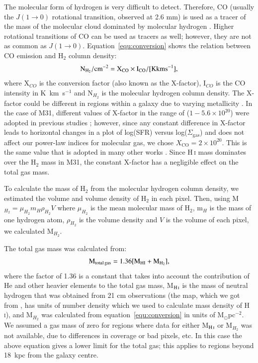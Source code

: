 The molecular form of hydrogen is very difficult to detect. Therefore, CO (usually the $J(1\rightarrow 0)$ rotational transition, observed at 2.6 mm) is used as a tracer of the mass of the molecular cloud dominated by molecular hydrogen \citep[see, for example,][]{Sanders84}. Higher rotational transitions of CO can be used as tracers as well; however, they are not as common as $J(1\rightarrow 0)$. Equation~\ref{equ:conversion} shows the relation between CO emission and H$_2$ column density:
\begin{equation}
\label{equ:conversion}
\rm N_{H_2}/\rm cm^{-2} = X_{CO} \times I_{CO}/[{\mathrm K km s^{-1}}],
\end{equation}
\noindent where X$_{CO}$ is the conversion factor (also known as the X-factor), I$_{CO}$ is the CO intensity in  K~km~s$^{-1}$ and N$_{H_2}$ is the molecular hydrogen column density. The X-factor could be different in regions within a galaxy due to varying metallicity \citep{Wilson95, Bosselli02, Bolato13}. In the case of M31, different values of X-factor in the range of ($1-5.6 \times 10^{20}$) were adopted in previous studies \citep[e.g.][]{Ford13, Bolato13, Leroy11, Bolato08, Nieten06}; however, since any constant difference in X-factor leads to horizontal changes in a plot of log(SFR) versus log($\Sigma_{\mathrm {gas}}$) and does not affect our power-law indices for molecular gas, we chose $X_{\mathrm {CO}}= 2 \times 10^{20}$. This is the same value that is adopted in many other works \citep[e.g.][]{Ford13, Smith12}. Since H\,{\textsc i} mass dominates over the H$_2$ mass in M31, the constant X-factor has a negligible effect on the total gas mass.

To calculate the mass of H$_2$ from the molecular hydrogen column density, we estimated the volume and volume density of H$_2$ in each pixel. Then, using M$_{H_2} = \mu_{H_2}m_H\rho_{H_2}V$ where $ \mu_{H_2}$ is the mean molecular mass of H$_2$, m$_H$ is the mass of one hydrogen atom, $\rho_{H_2}$ is the volume density and $V$ is the volume of each pixel, we calculated M$_{H_2}$. 

The total gas mass was calculated from:
\begin{equation}
\label{equ:total_gas}
\rm M_{\mathrm{total \, gas}} = 1.36[M_{\mathrm H I}+M_{H_2}],
\end{equation}
\noindent where the factor of 1.36 is a constant that takes into account the contribution of He and other heavier elements to the total gas mass, M$_{\mathrm H\,{\textsc i}}$ is the mass of neutral hydrogen that was obtained from 21 cm observations (the map, which we got from \citet{Chemin09}, has units of number density which we used to calculate mass density of H\,{\textsc i}), and M$_{H_2}$ was calculated from equation~\ref{equ:conversion} in units of M$_{\odot}$pc$^{-2}$. We assumed a gas mass of zero for regions where data for  either M$_{\mathrm H\,{\textsc i}}$ or M$_{H_2}$ was not available, due to differences in coverage or bad pixels, etc. In this case the above equation gives a lower limit for the total gas; this applies to regions beyond 18~kpc from the galaxy centre.

